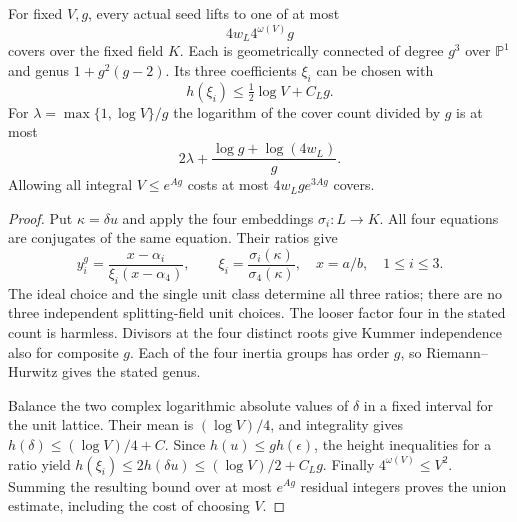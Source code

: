 \begin{theorem}
For fixed $V,g$, every actual seed lifts to one of at most
\[
 4w_L4^{\omega(V)}g
\]
covers over the fixed field $K$. Each is geometrically connected of
degree $g^3$ over $\mathbb P^1$ and genus $1+g^2(g-2)$. Its three
coefficients $\xi_i$ can be chosen with
\[
 h(\xi_i)\le\tfrac12\log V+C_Lg.
\]
For $\lambda=\max\{1,\log V\}/g$ the logarithm of the cover count
divided by $g$ is at most
\[
 2\lambda+\frac{\log g+\log(4w_L)}g.
\]
Allowing all integral $V\le e^{Ag}$ costs at most $4w_Lg e^{3Ag}$ covers.
\end{theorem}
\begin{proof}
Put $\kappa=\delta u$ and apply the four embeddings $\sigma_i:L\to K$.
All four equations are conjugates of the same equation. Their ratios give
\[
 y_i^g=\frac{x-\alpha_i}{\xi_i(x-\alpha_4)},\qquad
 \xi_i=\frac{\sigma_i(\kappa)}{\sigma_4(\kappa)},\quad
 x=a/b,\quad 1\le i\le3.
\]
The ideal choice and the single unit class determine all three ratios;
there are no three independent splitting-field unit choices. The looser
factor four in the stated count is harmless. Divisors at the four distinct
roots give Kummer independence also for composite $g$. Each of the four
inertia groups has order $g$, so Riemann--Hurwitz gives the stated genus.

Balance the two complex logarithmic absolute values of $\delta$ in a
fixed interval for the unit lattice. Their mean is $(\log V)/4$, and
integrality gives $h(\delta)\le(\log V)/4+C$. Since
$h(u)\le g h(\epsilon)$, the height inequalities for a ratio yield
$h(\xi_i)\le2h(\delta u)\le(\log V)/2+C_Lg$.
Finally $4^{\omega(V)}\le V^2$. Summing the resulting bound over at most
$e^{Ag}$ residual integers proves the union estimate, including the cost
of choosing $V$.
\end{proof}

